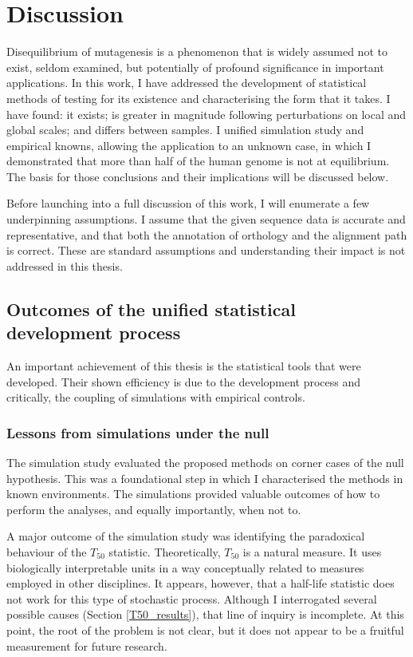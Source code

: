 \chapter{Discussion}

Disequilibrium of mutagenesis is a phenomenon that is widely assumed not to exist, seldom examined, but potentially of profound significance in important applications. In this work, I have addressed the development of statistical methods of testing for its existence and characterising the form that it takes. I have found: it exists; is greater in magnitude following perturbations on local and global scales; and differs between samples. I unified simulation study and empirical knowns, allowing the application to an unknown case, in which I demonstrated that more than half of the human genome is not at equilibrium. The basis for those conclusions and their implications will be discussed below. 

Before launching into a full discussion of this work, I will enumerate a few underpinning assumptions. I assume that the given sequence data is accurate and representative, and that both the annotation of orthology and the alignment path is correct. These are standard assumptions and understanding their impact is not addressed in this thesis. 

\section{Outcomes of the unified statistical development process}
An important achievement of this thesis is the statistical tools that were developed. Their shown efficiency is due to the development process and critically,  the coupling of simulations with empirical controls. 

\subsection{Lessons from simulations under the null}
The simulation study evaluated the proposed methods on corner cases of the null hypothesis. This was a foundational step in which I characterised the methods in known environments. The simulations provided valuable outcomes of how to perform the analyses, and equally importantly, when not to. 

A major outcome of the simulation study was identifying the paradoxical behaviour of the $T_{50}$ statistic. Theoretically, $T_{50}$ is a natural measure. It uses biologically interpretable units in a way conceptually related to measures employed in other disciplines. It appears, however, that a half-life statistic does not work for this type of stochastic process. Although I interrogated several possible causes  (Section \ref{T50_results}), that line of inquiry is incomplete. At this point, the root of the problem is not clear, but it does not appear to be a fruitful measurement for future research. 

